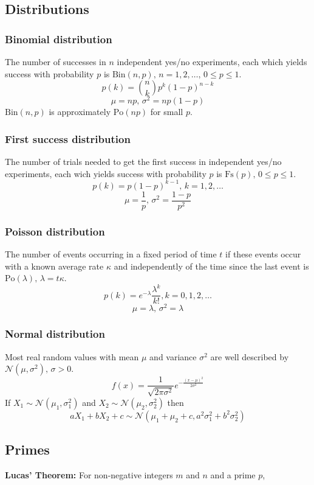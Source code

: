 \documentclass[letterpaper,landscape]{article}
\begin{document}
\begin{multicols*}{3}
    \subsection{Distributions}

    \subsubsection{Binomial distribution}
    The number of successes in $n$ independent yes/no experiments, each which yields success with probability $p$ is $\textrm{Bin}(n,p),\,n=1,2,\dots,\, 0\leq p\leq1$.
    \[p(k)=\binom{n}{k}p^k(1-p)^{n-k}\]
    \[\mu = np,\,\sigma^2=np(1-p)\]
    $\textrm{Bin}(n,p)$ is approximately $\textrm{Po}(np)$ for small $p$.
    
    \subsubsection{First success distribution}
    The number of trials needed to get the first success in independent yes/no experiments, each wich yields success with probability $p$ is $\textrm{Fs}(p),\,0\leq p\leq1$.
    \[p(k)=p(1-p)^{k-1},\,k=1,2,\dots\]
    \[\mu = \frac1p,\,\sigma^2=\frac{1-p}{p^2}\]
    
    \subsubsection{Poisson distribution}
    The number of events occurring in a fixed period of time $t$ if these events occur with a known average rate $\kappa$ and independently of the time since the last event is $\textrm{Po}(\lambda),\,\lambda=t\kappa$.
    \[p(k)=e^{-\lambda}\frac{\lambda^k}{k!}, k=0,1,2,\dots\]
    \[\mu=\lambda,\,\sigma^2=\lambda\]
    
    \subsubsection{Normal distribution}
    Most real random values with mean $\mu$ and variance $\sigma^2$ are well described by $\mathcal{N}(\mu,\sigma^2),\,\sigma>0$.
    \[ f(x) = \frac{1}{\sqrt{2\pi\sigma^2}}e^{-\frac{(x-\mu)^2}{2\sigma^2}} \]
    If $X_1 \sim \mathcal{N}(\mu_1,\sigma_1^2)$ and $X_2 \sim \mathcal{N}(\mu_2,\sigma_2^2)$ then
    \[ aX_1 + bX_2 + c \sim \mathcal{N}(\mu_1+\mu_2+c,a^2\sigma_1^2+b^2\sigma_2^2) \]
    
    \subsection{Primes}
    \textbf{Lucas' Theorem:} For non-negative integers $m$ and $n$ and a prime $p$,
     

\end{multicols*}
\end{document}
